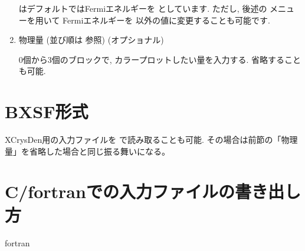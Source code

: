 \documentclass[letterpaper,10pt,dvipdfmx,openany]{sphinxmanual}
\begin{document}
\begin{enumerate}
\sphinxAtStartPar
{} はデフォルトではFermiエネルギーを
 としています. ただし,
後述の  メニューを用いて
Fermiエネルギーを  以外の値に変更することも可能です.

\item {} 
\sphinxAtStartPar
物理量 (並び順は {\hyperref[\detokenize{input:format}]{}} 参照) (オプショナル)

\sphinxAtStartPar
0個から3個のブロックで, カラープロットしたい量を入力する.
省略することも可能.

\end{enumerate}


\section{BXSF形式}
\label{\detokenize{input:bxsf}}
\sphinxAtStartPar
XCrysDen用の入力ファイルを  で読み取ることも可能.
その場合は前節の「物理量」を省略した場合と同じ振る舞いになる。


\section{C/fortranでの入力ファイルの書き出し方}
\label{\detokenize{input:c-fortran}}\label{\detokenize{input:format}}
\sphinxAtStartPar
fortran
\end{document}
